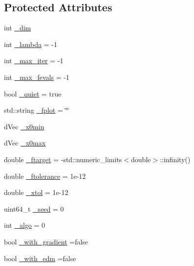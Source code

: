 \subsection*{Protected Attributes}
\begin{DoxyCompactItemize}
\item 
int \hyperlink{classlibcmaes_1_1Parameters_affc62ae5c5f1db4f88e4c2dc96387af6}{\-\_\-dim}
\item 
int \hyperlink{classlibcmaes_1_1Parameters_af732f7206f23cbd6ec2bbd4e217a9a2b}{\-\_\-lambda} = -\/1
\item 
int \hyperlink{classlibcmaes_1_1Parameters_a60abfc730c5aa46e42ebd1598b59caa6}{\-\_\-max\-\_\-iter} = -\/1
\item 
int \hyperlink{classlibcmaes_1_1Parameters_ad316488121bd51f62b28e8183d591c9e}{\-\_\-max\-\_\-fevals} = -\/1
\item 
bool \hyperlink{classlibcmaes_1_1Parameters_a6f6dad55c02a23891e3280cad288295a}{\-\_\-quiet} = true
\item 
std\-::string \hyperlink{classlibcmaes_1_1Parameters_aa49511ea00199348ea94f1aa53fe5bc1}{\-\_\-fplot} = \char`\"{}\char`\"{}
\item 
d\-Vec \hyperlink{classlibcmaes_1_1Parameters_aa3bb27467698d9cb7fc7e0a83b48800f}{\-\_\-x0min}
\item 
d\-Vec \hyperlink{classlibcmaes_1_1Parameters_aece9694af9bee78bb13b0994db7ac45e}{\-\_\-x0max}
\item 
double \hyperlink{classlibcmaes_1_1Parameters_a837dbcfba351a043441076a11666f92c}{\-\_\-ftarget} = -\/std\-::numeric\-\_\-limits$<$double$>$\-::infinity()
\item 
double \hyperlink{classlibcmaes_1_1Parameters_ab6c11cc112b5709e9039967e881c808e}{\-\_\-ftolerance} = 1e-\/12
\item 
double \hyperlink{classlibcmaes_1_1Parameters_aaa9e8eedba7d7140d116163b40f653f8}{\-\_\-xtol} = 1e-\/12
\item 
uint64\-\_\-t \hyperlink{classlibcmaes_1_1Parameters_ac6d616c3d5295fec8a0b230592fb767a}{\-\_\-seed} = 0
\item 
int \hyperlink{classlibcmaes_1_1Parameters_a7a5fc681b0c7294ef050ace344f923db}{\-\_\-algo} = 0
\item 
bool \hyperlink{classlibcmaes_1_1Parameters_aff76cebbfef51c20398aab8f49a3676a}{\-\_\-with\-\_\-gradient} =false
\item 
bool \hyperlink{classlibcmaes_1_1Parameters_adbaa11317ae66061e097c372522b8758}{\-\_\-with\-\_\-edm} =false
\item 

\end{DoxyCompactItemize}
